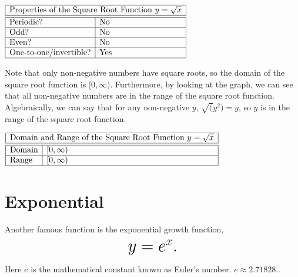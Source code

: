 \documentclass[nooutcomes]{ximera}
\begin{document}
\begin{center}
$
\begin{array}{|l|l|}
 \hline
 \multicolumn{2}{|c|}{\text{\normalfont Properties of the Square Root Function } y=\sqrt{x}} \\
\hline
 \hline
\text{Periodic?} & \text{No} \\ \hline
\text{Odd?} & \text{No} \\ \hline
\text{Even?} & \text{No} \\ \hline
\text{One-to-one/invertible?} & \text{Yes}\\ \hline
\end{array}
$
\end{center}

Note that only non-negative numbers have square roots, so the domain of the square root function is $[0, \infty)$. Furthermore, by looking at the graph, we can see that all non-negative numbers are in the range of the square root function. Algebraically, we can say that for any non-negative $y$, $\sqrt(y^2) = y$, so $y$ is in the range of the square root function. 

\begin{center}
$
\begin{array}{|l|l|}
 \hline
 \multicolumn{2}{|c|}{\text{\normalfont Domain and Range of the Square Root Function } y=\sqrt{x}} \\
\hline
 \hline
\text{Domain} & [0, \infty) \\ \hline
\text{Range} & [0, \infty) \\ \hline
\end{array}
$
\end{center}


\section{Exponential}
Another famous function is the exponential growth function, $$ \mbox{\huge $y=e^{x}.$}$$ 

Here $e$ is the mathematical constant known as Euler's number.  $e \approx 2.71828 .$.

\begin{image}
\end{image}
\end{document}
